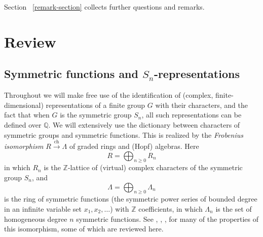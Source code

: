 \documentclass[12pt]{amsart}
\theoremstyle{plain}
\theoremstyle{definition}
\begin{document}
Section ~\ref{remark-section} collects 
further questions and remarks.

\tableofcontents

\section{Review}
\label{background-section}

\subsection{Symmetric functions and $S_n$-representations}
\label{symmetric-function-review-section}

Throughout we will make 
free use of the identification of (complex, finite-dimensional)
representations of a finite group
$G$ with their characters, and  the fact that when $G$ is the symmetric
group $S_n$, all such representations can be defined over ${{\mathbb Q}}$.
We will extensively use the dictionary between
characters of symmetric groups and symmetric functions.  This is realized by
the {\it Frobenius isomorphism}
$
R \overset{{\operatorname{ch}}}{\longrightarrow} \Lambda
$
of graded rings and (Hopf) algebras.
Here $$
R=\bigoplus_{ n \geq 0 } R_n
$$
in which 
$R_n$ is the ${{\mathbb{Z}}}$-lattice of (virtual) complex characters 
of the symmetric group $S_n$,
and 
$$
\Lambda=\bigoplus_{n \geq 0} \Lambda_n
$$ 
is the ring of symmetric functions
(the symmetric power series of bounded degree in an infinite variable set 
$x_1,x_2,\ldots$) with ${{\mathbb{Z}}}$ coefficients, 
in which $\Lambda_n$ is the set of homogeneous 
degree $n$ symmetric functions.  See
\cite[\S 7.3]{Fulton}, 
\cite[\S I.7]{Macdonald}, 
\cite[\S 4.7]{Sagan}, 
\cite[\S 7.18]{Stanley} 
for many of the properties of this isomorphism, some of which are reviewed here.
\end{document}
